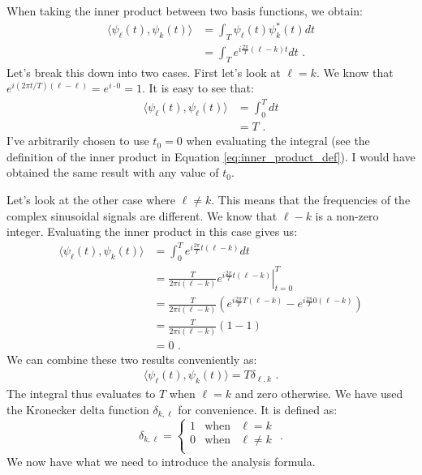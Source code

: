 When taking the inner product between two basis functions, we obtain:
\begin{align}
  \langle \psi_\ell(t), \psi_k(t) \rangle & = \int_T \psi_\ell(t) \psi_k^*(t) dt            \\
                                          & = \int_T e^{i\frac{2\pi}{T}(\ell-k) t} dt \,\,.
\end{align}
Let's break this down into two cases. First let's look at $\ell=k$. 
We know that $e^{i(2\pi t/T)(\ell-\ell)}=e^{i \cdot 0} = 1$. It is easy to see that:
\begin{align}
  \langle \psi_\ell(t), \psi_\ell(t) \rangle & = \int_{0}^T dt \\
                                             & = T \,\,.
\end{align}
I've arbitrarily chosen to use $t_0=0$ when evaluating the integral (see the definition of the
inner product in Equation \ref{eq:inner_product_def}). I would have obtained the same result with any value of $t_0$.

Let's look at the other case where $\ell \ne k$. This means that the frequencies of the complex
sinusoidal signals are different. We know that $\ell - k$ is a non-zero integer.
Evaluating the inner product in this case gives us:
\begin{align}
  \langle \psi_\ell(t), \psi_k(t) \rangle & = \int_0^T  e^{i\frac{2\pi}{T}t(\ell-k)} dt                                                           \\
                                          & = \left.\frac{T}{2\pi i (\ell-k)} e^{i\frac{2\pi}{T}t(\ell-k)} \right\vert_{t=0}^{T}                  \\
                                          & = \frac{T}{2\pi i (\ell-k)}\left( e^{i\frac{2\pi}{T}T(\ell-k)} - e^{i\frac{2\pi}{T}0(\ell-k)} \right) \\
                                          & = \frac{T}{2\pi i (\ell-k)}( 1 - 1 )                                                                  \\
                                          & = 0 \,\,.
\end{align}
We can combine these two results conveniently as:
\begin{align}
  \langle \psi_\ell(t), \psi_k(t) \rangle = T\delta_{\ell,k} \,\,.
\end{align}
The integral thus evaluates to $T$ when $\ell=k$ and zero otherwise. We have used
the Kronecker delta function $\delta_{k,\ell}$ for convenience. It is defined as:
\begin{equation}
  \delta_{k,\ell} = \left\{
  \begin{array}{rcr}
    1 & \mathrm{when} & \ell=k     \\
    0 & \mathrm{when} & \ell \ne k \\
  \end{array}\right.\,\,.
\end{equation}
We now have what we need to introduce the analysis formula.

